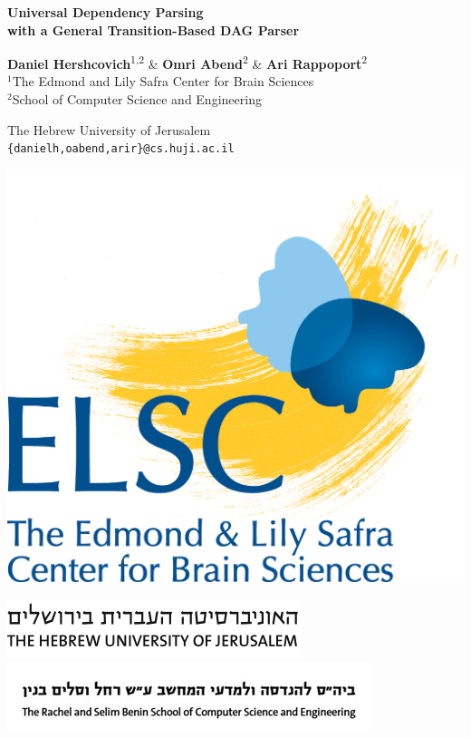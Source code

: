 \documentclass[a0,portrait]{a0poster}
\begin{document}
\begin{center}
	\veryHuge \color{NavyBlue} \textbf{Universal Dependency Parsing \\
	with a General Transition-Based DAG Parser}
\end{center}
\begin{minipage}[b]{0.57\linewidth}
\LARGE \textbf{Daniel Hershcovich}\textsuperscript{1,2} \&
	   \textbf{Omri Abend}\textsuperscript{2} \&
	   \textbf{Ari Rappoport}\textsuperscript{2} \\[0.5cm]
\large $^1$The Edmond and Lily Safra Center for Brain Sciences \\
  $^2$School of Computer Science and Engineering
  \setlength{\columnseprule}{0pt}
  \setlength\multicolsep{-20pt}
  \begin{multicols}{2}
  The Hebrew University of Jerusalem \\
  \texttt{\{danielh,oabend,arir\}@cs.huji.ac.il}
  \end{multicols}
\end{minipage}
\hfill
\begin{minipage}[b]{.1\linewidth}
\includegraphics[width=\linewidth]{elsc_logo.png}
\end{minipage}
\begin{minipage}[b]{.18\linewidth}
\includegraphics[width=\linewidth]{huji_banner.png}
\includegraphics[width=1.04\linewidth]{cse_banner.jpg}
\end{minipage}
\end{document}
